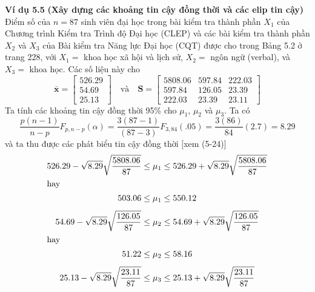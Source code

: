 \noindent\textbf{Ví dụ 5.5} \textbf{(Xây dựng các khoảng tin cậy đồng thời và các elip tin cậy)}
Điểm số của $n=87$ sinh viên đại học trong bài kiểm tra thành phần $X_1$ của Chương trình Kiểm tra Trình độ Đại học (CLEP) và các bài kiểm tra thành phần $X_2$ và $X_3$ của Bài kiểm tra Năng lực Đại học (CQT) được cho trong Bảng 5.2 ở trang 228, với $X_1=$ khoa học xã hội và lịch sử, $X_2=$ ngôn ngữ (verbal), và $X_3=$ khoa học. Các số liệu này cho
\[
  \bar{\mathbf{x}}=\begin{bmatrix}526.29\\54.69\\25.13\end{bmatrix}
  \quad\text{và}\quad
  \mathbf{S}=\begin{bmatrix}5808.06&597.84&222.03\\597.84&126.05&23.39\\222.03&23.39&23.11\end{bmatrix}
\]
Ta tính các khoảng tin cậy đồng thời 95\% cho $\mu_1$, $\mu_2$ và $\mu_3$. Ta có
\[
  \frac{p(n-1)}{n-p}F_{p,n-p}(\alpha)=\frac{3(87-1)}{(87-3)}F_{3,84}(.05)=\frac{3(86)}{84}(2.7)=8.29
\]
và ta thu được các phát biểu tin cậy đồng thời [xem (5-24)]
\begin{align*}
  526.29-\sqrt{8.29}\sqrt{\frac{5808.06}{87}}&\le\mu_1\le526.29+\sqrt{8.29}\sqrt{\frac{5808.06}{87}}\\
\intertext{hay}
  503.06&\le\mu_1\le550.12\\[4pt]
  54.69-\sqrt{8.29}\sqrt{\frac{126.05}{87}}&\le\mu_2\le54.69+\sqrt{8.29}\sqrt{\frac{126.05}{87}}\\
\intertext{hay}
  51.22&\le\mu_2\le58.16\\[4pt]
  25.13-\sqrt{8.29}\sqrt{\frac{23.11}{87}}&\le\mu_3\le25.13+\sqrt{8.29}\sqrt{\frac{23.11}{87}}
\end{align*}
 
